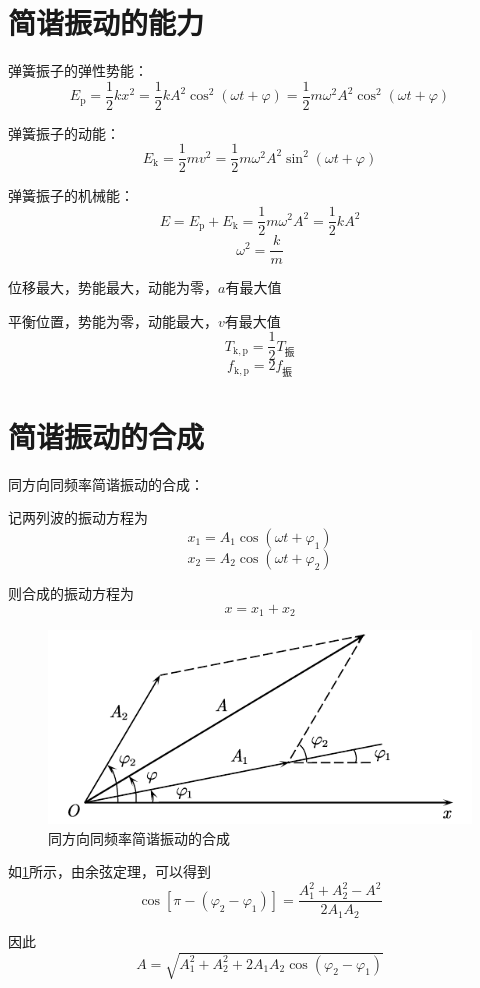 \documentclass[12pt, a4paper, twoside]{ctexbook}
\begin{document}
\section{简谐振动的能力}
{\sonti 弹簧振子的弹性势能}：
$$
E_{\mathrm{p}}=\frac{1}{2}kx^2=\frac{1}{2}kA^2\cos^2\left(\omega t+\varphi\right)=\frac{1}{2}m\omega^2A^2\cos^2\left(\omega t+\varphi\right)
$$

{\sonti 弹簧振子的动能}：
$$
E_{\mathrm{k}}=\frac{1}{2}mv^2=\frac{1}{2}m\omega^2 A^2\sin^2\left(\omega t+\varphi\right)
$$

{\sonti 弹簧振子的机械能}：
$$
E=E_{\mathrm{p}}+E_{\mathrm{k}}=\frac{1}{2}m\omega^2A^2=\frac{1}{2}kA^2
$$
$$
\omega^2=\frac{k}{m}
$$

位移最大，势能最大，动能为零，$a$有最大值

平衡位置，势能为零，动能最大，$v$有最大值
$$
T_\mathrm{k,p}=\frac{1}{2}T_\text{振}
$$
$$
f_\mathrm{k,p}=2f_\text{振}
$$
\section{简谐振动的合成}
{\sonti 同方向同频率简谐振动的合成}：

记两列波的振动方程为
$$
x_1=A_1\cos\left(\omega t+\varphi_1\right)
$$
$$
x_2=A_2\cos\left(\omega t+\varphi_2\right)
$$

则合成的振动方程为
$$
x=x_1+x_2
$$
\begin{figure}[H]
    \centerline{\includegraphics[scale=0.88]{同方向同频率简谐振动的合成.pdf}}
    \caption{同方向同频率简谐振动的合成}\label{fig:同方向同频率简谐振动的合成}
\end{figure}
如\textcolor{blue}{\cref{fig:同方向同频率简谐振动的合成}}所示，由余弦定理，可以得到
$$
\cos\left[\pi-\left(\varphi_2-\varphi_1\right)\right]=\frac{A_1^2+A_2^2-A^2}{2A_1A_2}
$$

因此
$$
A=\sqrt{A_1^2+A_2^2+2A_1A_2\cos\left(\varphi_2-\varphi_1\right)}
$$
\end{document}
